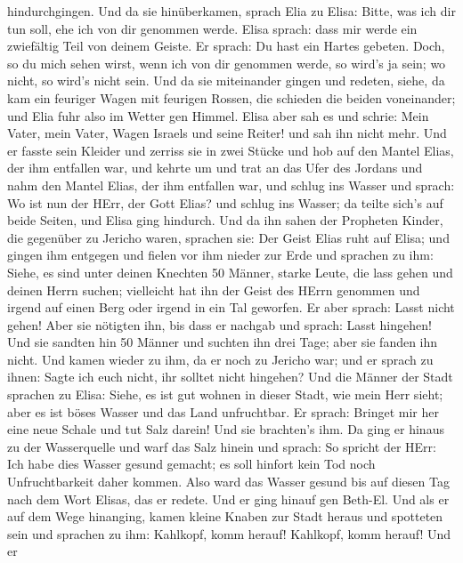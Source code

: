 hindurchgingen.  Und da sie hinüberkamen, sprach Elia zu
Elisa: Bitte, was ich dir tun soll, ehe ich von dir genommen werde.
Elisa sprach: dass mir werde ein zwiefältig Teil von deinem Geiste.
 Er sprach: Du hast ein Hartes gebeten. Doch, so du mich
sehen wirst, wenn ich von dir genommen werde, so wird's ja sein; wo
nicht, so wird's nicht sein.  Und da sie miteinander gingen
und redeten, siehe, da kam ein feuriger Wagen mit feurigen Rossen, die
schieden die beiden voneinander; und Elia fuhr also im Wetter gen
Himmel.  Elisa aber sah es und schrie: Mein Vater, mein
Vater, Wagen Israels und seine Reiter! und sah ihn nicht mehr. Und er
fasste sein Kleider und zerriss sie in zwei Stücke  und hob
auf den Mantel Elias, der ihm entfallen war, und kehrte um und trat an
das Ufer des Jordans  und nahm den Mantel Elias, der ihm
entfallen war, und schlug ins Wasser und sprach: Wo ist nun der HErr,
der Gott Elias? und schlug ins Wasser; da teilte sich's auf beide
Seiten, und Elisa ging hindurch.  Und da ihn sahen der
Propheten Kinder, die gegenüber zu Jericho waren, sprachen sie: Der
Geist Elias ruht auf Elisa; und gingen ihm entgegen und fielen vor ihm
nieder zur Erde  und sprachen zu ihm: Siehe, es sind unter
deinen Knechten 50 Männer, starke Leute, die lass gehen und deinen Herrn
suchen; vielleicht hat ihn der Geist des HErrn genommen und irgend auf
einen Berg oder irgend in ein Tal geworfen. Er aber sprach: Lasst nicht
gehen!  Aber sie nötigten ihn, bis dass er nachgab und
sprach: Lasst hingehen! Und sie sandten hin 50 Männer und suchten ihn
drei Tage; aber sie fanden ihn nicht.  Und kamen wieder zu
ihm, da er noch zu Jericho war; und er sprach zu ihnen: Sagte ich euch
nicht, ihr solltet nicht hingehen?  Und die Männer der
Stadt sprachen zu Elisa: Siehe, es ist gut wohnen in dieser Stadt, wie
mein Herr sieht; aber es ist böses Wasser und das Land unfruchtbar.
 Er sprach: Bringet mir her eine neue Schale und tut Salz
darein! Und sie brachten's ihm.  Da ging er hinaus zu der
Wasserquelle und warf das Salz hinein und sprach: So spricht der HErr:
Ich habe dies Wasser gesund gemacht; es soll hinfort kein Tod noch
Unfruchtbarkeit daher kommen.  Also ward das Wasser gesund
bis auf diesen Tag nach dem Wort Elisas, das er redete. 
Und er ging hinauf gen Beth-El. Und als er auf dem Wege hinanging, kamen
kleine Knaben zur Stadt heraus und spotteten sein und sprachen zu ihm:
Kahlkopf, komm herauf! Kahlkopf, komm herauf!  Und er
